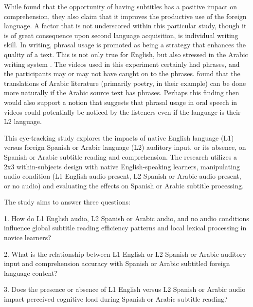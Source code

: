 While \textcite{borrás1994} found that the opportunity of having
subtitles has a positive impact on comprehension, they also claim that
it improves the productive use of the foreign language. A factor that is
not underscored within this particular study, though it is of great
consequence upon second language acquisition, is individual writing
skill. In writing, phrasal usage is promoted as being a strategy that
enhances the quality of a text. This is not only true for English, but
also stressed in the Arabic writing system \cite{anis2022}. The
videos used in this experiment certainly had phrases, and the
participants may or may not have caught on to the phrases. \textcite{anis2022} found that the translations of Arabic literature (primarily
poetry, in their example) can be done more naturally if the Arabic
source text has phrases. Perhaps this finding then would also support a
notion that suggests that phrasal usage in oral speech in videos could
potentially be noticed by the listeners even if the language is their L2
language.

This eye-tracking study explores the impacts of native English language
(L1) versus foreign Spanish or Arabic language (L2) auditory input, or
its absence, on Spanish or Arabic subtitle reading and comprehension.
The research utilizes a 2x3 within-subjects design with native
English-speaking learners, manipulating audio condition (L1 English
audio present, L2 Spanish or Arabic audio present, or no audio) and
evaluating the effects on Spanish or Arabic subtitle processing.

The study aims to answer three questions:

1. How do L1 English audio, L2 Spanish or Arabic audio, and no audio
conditions influence global subtitle reading efficiency patterns and
local lexical processing in novice learners?

2. What is the relationship between L1 English or L2 Spanish or Arabic
auditory input and comprehension accuracy with Spanish or Arabic
subtitled foreign language content?

3. Does the presence or absence of L1 English versus L2 Spanish or
Arabic audio impact perceived cognitive load during Spanish or Arabic
subtitle reading?
